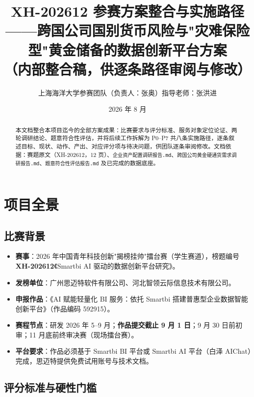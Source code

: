 \documentclass[UTF8,12pt]{ctexart}
\title{\textbf{XH-202612 参赛方案整合与实施路径}\\
\large ——跨国公司国别货币风险与"灾难保险型"黄金储备的数据创新平台方案\\[4pt]
\small （内部整合稿，供逐条路径审阅与修改）}
\author{上海海洋大学参赛团队（负责人：张奥）\quad 指导老师：张洪进}
\date{2026 年 8 月}
\begin{document}
\maketitle

\begin{abstract}
\noindent 本文档整合本项目迄今的全部方案成果：比赛要求与评分标准、服务对象定位论证、两轮调研结论、题意符合性评估，并将后续工作拆解为 P0--P7 共八条实施路径，逐条叙述目标、现状、动作、产出、对应评分项与待决问题，供团队逐条审阅修改。文档依据：赛题原文（XH-202612，12 页）、\texttt{企业资产配置调研报告.md}、\texttt{跨国公司黄金硬通货需求调研报告.md}、\texttt{题意符合性评估报告.md} 及已完成的数据底座。
\end{abstract}

\tableofcontents
\newpage

\section{项目全景}

\subsection{比赛背景}

\begin{itemize}
\item \textbf{赛事}：2026 年中国青年科技创新"揭榜挂帅"擂台赛（学生赛道），榜题编号 \textbf{XH-202612}《Smartbi AI 驱动的数据创新平台研究》。
\item \textbf{发榜单位}：广州思迈特软件有限公司、河北智领云际信息技术有限公司。
\item \textbf{申报作品}：《AI 赋能轻量化 BI 服务：依托 Smartbi 搭建普惠型企业数据智能创新平台》（作品编码 592915）。
\item \textbf{赛程节点}：研发 2026 年 5--9 月；\textbf{作品提交截止 9 月 1 日}；9 月 30 日前初审；11 月底前终审决赛（现场擂台赛）。
\item \textbf{平台要求}：作品必须基于 Smartbi BI 平台或 Smartbi AI 平台（白泽 AIChat）完成，思迈特提供免费试用账号与技术文档。
\end{itemize}

\subsection{评分标准与硬性门槛}
\end{document}
